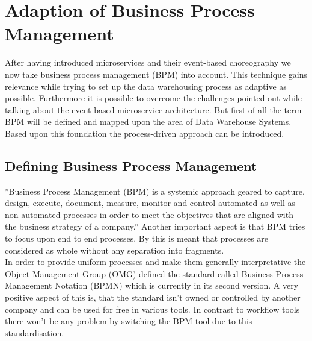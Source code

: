 \section{Adaption of Business Process Management}
\label{sec:bpm}
After having introduced microservices and their event-based choreography we now take business process management (BPM) into account. This technique gains relevance while trying to set up the data warehousing process as adaptive as possible. Furthermore it is possible to overcome the challenges pointed out while talking about the event-based microservice architecture.\newline
But first of all the term BPM will be defined and mapped upon the area of Data Warehouse Systems. Based upon this foundation the process-driven approach can be introduced. 

\subsection{Defining Business Process Management}
''Business Process Management (BPM) is a systemic approach geared to capture, design, execute, document, measure, monitor and control automated as well as non-automated processes in order to meet the objectives that are aligned with the business strategy of a company.'' \cite{bpmDef} Another important aspect is that BPM tries to focus upon end to end processes. By this is meant that processes are considered as whole without any separation into fragments.\cite{praxisBPM}\newline
\\
In order to provide uniform processes and make them generally interpretative the Object Management Group (OMG) defined the standard called Business Process Management Notation (BPMN) which is currently in its second version. A very positive aspect of this is, that the standard isn't owned or controlled by another company and can be used for free in various tools. In contrast to workflow tools there won't be any problem by switching the BPM tool due to this standardisation. \cite{bpmMethodStyle}

